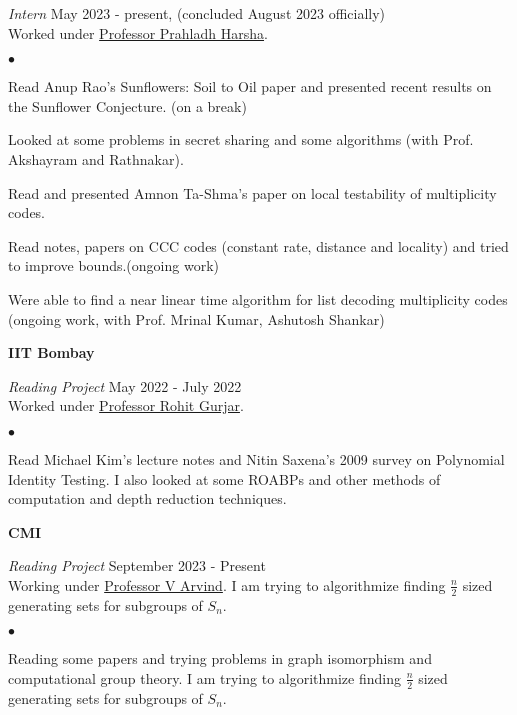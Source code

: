 \documentclass[margin,line, 10pt]{res}
\newenvironment{list2}{
  \begin{list}{$\bullet$}{%
      \setlength{\itemsep}{0in}
      \setlength{\parsep}{0in} \setlength{\parskip}{0in}
      \setlength{\topsep}{0in} \setlength{\partopsep}{0in} 
      \setlength{\leftmargin}{0.2in}}}{\end{list}}
\begin{document}
\begin{resume}
\vspace{-.3cm}
{\em Intern} \hfill {May 2023 - present, (concluded August 2023 officially)}\\
Worked under \href{https://www.tifr.res.in/~prahladh/}{Professor Prahladh Harsha}.

\vspace*{.05in}  
\begin{list2}
\item Read Anup Rao's Sunflowers: Soil to Oil paper and presented recent results on the Sunflower Conjecture. (on a break)
\item Looked at some problems in secret sharing and some algorithms (with Prof. Akshayram and Rathnakar).
\item Read and presented Amnon Ta-Shma's paper on local testability of multiplicity codes.
\item Read notes, papers on CCC codes (constant rate, distance and locality) and tried to improve bounds.(ongoing work)
\item Were able to find a near linear time algorithm for list decoding multiplicity codes (ongoing work, with Prof. Mrinal Kumar, Ashutosh Shankar)
\end{list2}

\eject
{\bf IIT Bombay}

\vspace{-.3cm}
{\em Reading Project} \hfill {May 2022 - July 2022}\\
Worked under \href{https://www.cse.iitb.ac.in/~rgurjar/}{Professor Rohit Gurjar}.

\vspace*{.05in}  
\begin{list2}
\item Read Michael Kim's lecture notes and Nitin Saxena's 2009 survey on Polynomial Identity Testing. I also looked at some ROABPs and other methods of computation and depth reduction techniques.
\end{list2}

{\bf CMI}

\vspace{-.3cm}
{\em Reading Project} \hfill {September 2023 - Present}\\
Working under \href{https://www.imsc.res.in/~arvind/}{Professor V Arvind}. I am trying to algorithmize finding $\frac{n}{2}$ sized generating sets for subgroups of $S_n$.

\vspace*{.05in}  
\begin{list2}
\item Reading some papers and trying problems in graph isomorphism and computational group theory. I am trying to algorithmize finding $\frac{n}{2}$ sized generating sets for subgroups of $S_n$.


\end{list2}
\end{resume}
\end{document}

